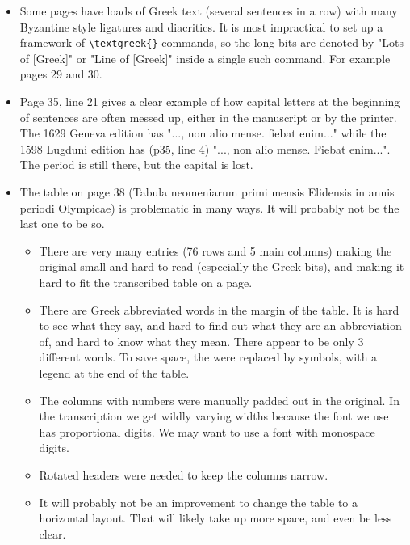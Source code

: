 \documentclass{report}
\begin{document}
\begin{itemize}
\item
Some pages have loads of Greek text (several sentences in a row) with many
Byzantine style ligatures and diacritics. It is most impractical to set up
a framework of \verb+\textgreek{}+ commands, so the long bits are denoted
by "Lots of [Greek]" or "Line of [Greek]" inside a single such command.
For example pages 29 and 30.
\item
Page 35, line 21 gives a clear example of how capital letters at the beginning
of sentences are often messed up, either in the manuscript or by the printer.
The 1629 Geneva edition has "..., non alio mense. fiebat enim..." while the
1598 Lugduni edition has (p35, line 4) "..., non alio mense. Fiebat enim...".
The period is still there, but the capital is lost.
\item
The table on page 38 (Tabula neomeniarum primi mensis Elidensis in annis
periodi Olympicae) is problematic in many ways. It will probably not be 
the last one to be so.
\begin{itemize}
  \item{}There are very many entries (76 rows and 5 main columns) making the
  original small and hard to read (especially the Greek bits), and making it
  hard to fit the transcribed table on a page.
  \item{}There are Greek abbreviated words in the margin of the table. It is
  hard to see what they say, and hard to find out what they are an abbreviation
  of, and hard to know what they mean. There appear to be only 3 different
  words. To save space, the were replaced by symbols, with a legend at the
  end of the table.
  \item{}The columns with numbers were manually padded out in the original.
  In the transcription we get wildly varying widths  because the font we use
  has proportional digits. We may want to use a font with monospace digits.
  \item{}Rotated headers were needed to keep the columns narrow.
  \item{}It will probably not be an improvement to change the table to a
  horizontal layout. That will likely take up more space, and even be
  less clear.
\end{itemize}
\end{itemize}
\end{document}
